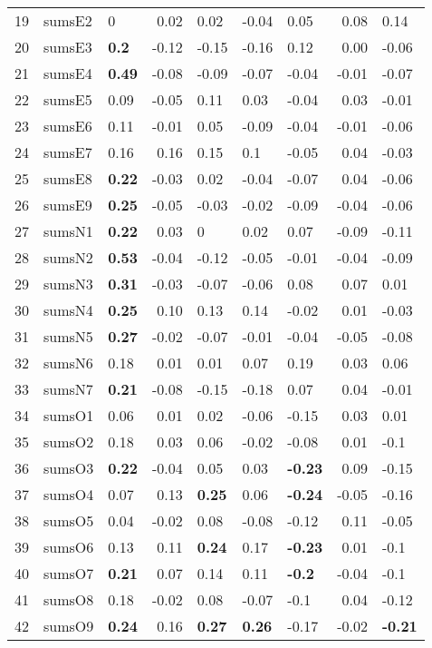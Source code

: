 \documentclass[,man,floatsintext]{apa6}
\theoremstyle{definition}
\theoremstyle{definition}
\theoremstyle{definition}
\theoremstyle{remark}
\begin{document}
\begin{table}[ht]
\begin{tabular}{rllrlllrl}
   19 & sumsE2 & 0 & 0.02 & 0.02 & -0.04 & 0.05 & 0.08 & 0.14 \\ 
   20 & sumsE3 & \textbf{0.2} & -0.12 & -0.15 & -0.16 & 0.12 & 0.00 & -0.06 \\ 
   21 & sumsE4 & \textbf{0.49} & -0.08 & -0.09 & -0.07 & -0.04 & -0.01 & -0.07 \\ 
   22 & sumsE5 & 0.09 & -0.05 & 0.11 & 0.03 & -0.04 & 0.03 & -0.01 \\ 
   23 & sumsE6 & 0.11 & -0.01 & 0.05 & -0.09 & -0.04 & -0.01 & -0.06 \\ 
   24 & sumsE7 & 0.16 & 0.16 & 0.15 & 0.1 & -0.05 & 0.04 & -0.03 \\ 
   25 & sumsE8 & \textbf{0.22} & -0.03 & 0.02 & -0.04 & -0.07 & 0.04 & -0.06 \\ 
   26 & sumsE9 & \textbf{0.25} & -0.05 & -0.03 & -0.02 & -0.09 & -0.04 & -0.06 \\ 
   27 & sumsN1 & \textbf{0.22} & 0.03 & 0 & 0.02 & 0.07 & -0.09 & -0.11 \\ 
   28 & sumsN2 & \textbf{0.53} & -0.04 & -0.12 & -0.05 & -0.01 & -0.04 & -0.09 \\ 
   29 & sumsN3 & \textbf{0.31} & -0.03 & -0.07 & -0.06 & 0.08 & 0.07 & 0.01 \\ 
   30 & sumsN4 & \textbf{0.25} & 0.10 & 0.13 & 0.14 & -0.02 & 0.01 & -0.03 \\ 
   31 & sumsN5 & \textbf{0.27} & -0.02 & -0.07 & -0.01 & -0.04 & -0.05 & -0.08 \\ 
   32 & sumsN6 & 0.18 & 0.01 & 0.01 & 0.07 & 0.19 & 0.03 & 0.06 \\ 
   33 & sumsN7 & \textbf{0.21} & -0.08 & -0.15 & -0.18 & 0.07 & 0.04 & -0.01 \\ 
   34 & sumsO1 & 0.06 & 0.01 & 0.02 & -0.06 & -0.15 & 0.03 & 0.01 \\ 
   35 & sumsO2 & 0.18 & 0.03 & 0.06 & -0.02 & -0.08 & 0.01 & -0.1 \\ 
   36 & sumsO3 & \textbf{0.22} & -0.04 & 0.05 & 0.03 & \textbf{-0.23} & 0.09 & -0.15 \\ 
   37 & sumsO4 & 0.07 & 0.13 & \textbf{0.25} & 0.06 & \textbf{-0.24} & -0.05 & -0.16 \\ 
   38 & sumsO5 & 0.04 & -0.02 & 0.08 & -0.08 & -0.12 & 0.11 & -0.05 \\ 
   39 & sumsO6 & 0.13 & 0.11 & \textbf{0.24} & 0.17 & \textbf{-0.23} & 0.01 & -0.1 \\ 
   40 & sumsO7 & \textbf{0.21} & 0.07 & 0.14 & 0.11 & \textbf{-0.2} & -0.04 & -0.1 \\ 
   41 & sumsO8 & 0.18 & -0.02 & 0.08 & -0.07 & -0.1 & 0.04 & -0.12 \\ 
   42 & sumsO9 & \textbf{0.24} & 0.16 & \textbf{0.27} & \textbf{0.26} & -0.17 & -0.02 & \textbf{-0.21} \\ 
   \hline
\end{tabular}
\endgroup
\end{table}
\end{document}
